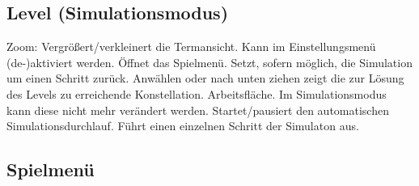 \subsection{Level (Simulationsmodus)}

\begin{center}
\setlength\fboxsep{20pt}
\setlength\fboxrule{1pt}
\end{center}

\begin{requirements}
 Zoom: Vergrößert/verkleinert die Termansicht. Kann im Einstellungsmenü (de-)aktiviert werden.
 Öffnet das Spielmenü.
 Setzt, sofern möglich, die Simulation um einen Schritt zurück.
 Anwählen oder nach unten ziehen zeigt die zur Lösung des Levels zu erreichende Konstellation.
 Arbeitsfläche. Im Simulationsmodus kann diese nicht mehr verändert werden.
 Startet/pausiert den automatischen Simulationsdurchlauf.
 Führt einen einzelnen Schritt der Simulaton aus.
\end{requirements}

\subsection{Spielmenü}

\begin{center}
\setlength\fboxsep{20pt}
\setlength\fboxrule{1pt}
\end{center}

